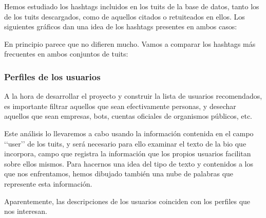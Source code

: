 Hemos estudiado los hashtags incluidos en los tuits de la base de datos, tanto los de los tuits
descargados, como de aquellos citados o retuiteados en ellos. Los siguientes gráficos dan una idea de los hashtags presentes en ambos casos:


En principio parece que no difieren mucho. Vamos a comparar los hashtags más frecuentes
en ambos conjuntos de tuits:


\subsubsection{Perfiles de los usuarios}
A la hora de desarrollar el proyecto y construir la lista de usuarios recomendados, es importante
filtrar aquellos que sean efectivamente personas, y desechar aquellos que sean empresas, bots, cuentas
oficiales de organismos públicos, etc.

Este análisis lo llevaremos a cabo usando la información contenida en el campo \lq\lq user\rq\rq
de los tuits, y será necesario para ello examinar el texto de la bio que incorpora, campo que
registra la información que los propios usuarios facilitan sobre ellos mismos. 
Para hacernos una idea del tipo de texto y contenidos a los que nos enfrentamos, hemos dibujado también
una nube de palabras que represente esta información.




Aparentemente, las descripciones de los usuarios coinciden con los perfiles que nos interesan.

